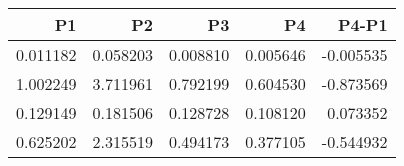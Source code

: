 \begin{tabular}{rrrrr}
\toprule
P1 & P2 & P3 & P4 & P4-P1 \\
\midrule
0.011182 & 0.058203 & 0.008810 & 0.005646 & -0.005535 \\
1.002249 & 3.711961 & 0.792199 & 0.604530 & -0.873569 \\
0.129149 & 0.181506 & 0.128728 & 0.108120 & 0.073352 \\
0.625202 & 2.315519 & 0.494173 & 0.377105 & -0.544932 \\
\bottomrule
\end{tabular}

